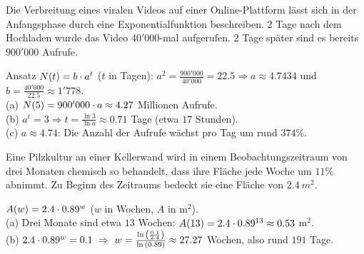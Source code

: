 \documentclass[11pt]{exam}
\begin{document}
\begin{questions}
\question[6]
Die Verbreitung eines viralen Videos auf einer Online-Plattform lässt sich in der Anfangsphase durch eine Exponentialfunktion beschreiben. $2$ Tage nach dem Hochladen wurde das Video $40'000$-mal aufgerufen. $2$ Tage später sind es bereits $900'000$ Aufrufe.
{\begin{solution}
		Ansatz $N(t)=b\cdot a^t$ ($t$ in Tagen): $a^2=\frac{900'000}{40'000}=22.5\Rightarrow a\approx4.7434$ und $b=\frac{40'000}{22.5}\approx1'778$.\\
		(a) $N(5)=900'000\cdot a\approx4.27$ Millionen Aufrufe.\\
		(b) $a^t=3\Rightarrow t=\frac{\ln{3}}{\ln{a}}\approx0.71$ Tage (etwa $17$ Stunden).\\
		(c) $a\approx4.74$: Die Anzahl der Aufrufe wächst pro Tag um rund $374\%$.
\end{solution}}
{}

\question[4] %
Eine Pilzkultur an einer Kellerwand wird in einem Beobachtungszeitraum von drei Monaten chemisch so behandelt, dass ihre Fläche jede Woche um $11\%$ abnimmt. Zu Beginn des Zeitraums bedeckt sie eine Fläche von $2.4\:m^2$.
{\begin{solution}
		$A(w)=2.4\cdot0.89^w$ ($w$ in Wochen, $A$ in m$^2$).\\
		(a) Drei Monate sind etwa $13$ Wochen: $A(13)=2.4\cdot0.89^{13}\approx0.53$ m$^2$.\\
		(b) $2.4\*0.89^w=0.1\ \Rightarrow\ w=\frac{\ln{\frac{0.1}{2.4}}}{\ln{0.89}}\approx27.27$ Wochen, also rund $191$ Tage.
\end{solution}}
{}


\end{questions}
\end{document}
